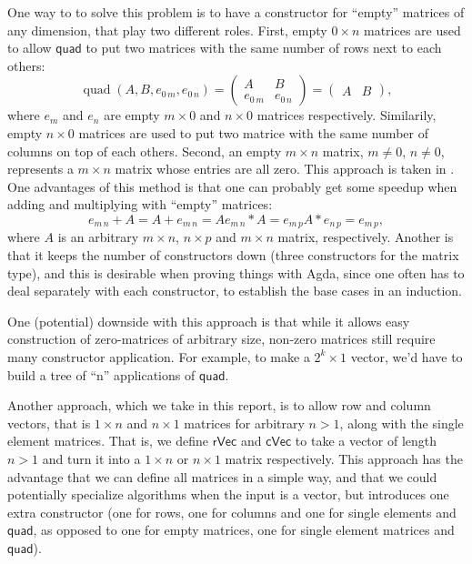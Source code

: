 \documentclass{article}
\newcommand{\Varid}[1]{\mathit{#1}}
\renewcommand\Varid[1]{\mathord{\textsf{#1}}}
\begin{document}
One way to to solve this problem is to have a constructor for ``empty'' matrices of any dimension, that play two different roles. First, empty $0 \times n$ matrices are used to allow \ensuremath{\Varid{quad}} to put two matrices with the same number of rows next to each others:
\begin{equation}
\operatorname{quad}(A, B, e_{0\,m}, e_{0\,n}) =
\begin{pmatrix}
  A & B \\
  e_{0\,m} & e_{0\,n}
\end{pmatrix} = 
\begin{pmatrix}
  A & B
\end{pmatrix},
\end{equation}
where $e_m$ and $e_n$ are empty $m \times 0$ and $n\times 0$ matrices respectively. Similarily, empty $n \times 0$ matrices are used to put two matrice with the same number of columns on top of each others. Second, an empty $m \times n$ matrix, $m \ne 0$, $n \ne 0$, represents a $m \times n$ matrix whose entries are all zero. This approach is taken in \cite{JP-PP}. One advantages of this method is that one can probably get some speedup when adding and multiplying with ``empty'' matrices:
\begin{equation*}
  e_{m\, n} + A = A + e_{m\,n} = A
  e_{m\, n} * A = e_{m\,p}
  A * e_{n\,p}  = e_{m\,p},
\end{equation*}
where $A$ is an arbitrary $m \times n$, $n \times p$ and $m \times n$ matrix, respectively.
Another is that it keeps the number of constructors down (three constructors for the matrix type), and this is desirable when proving things with Agda, since one often has to deal separately with each constructor, to establish the base cases in an induction.

One (potential) downside with this approach is that while it allows easy construction of zero-matrices of arbitrary size, non-zero matrices still require many constructor application. For example, to make a $2^k \times 1$ vector, we'd have to build a tree of ``n''  applications of \ensuremath{\Varid{quad}}.

Another approach, which we take in this report, is to allow row and column vectors, that is $1 \times n$ and $n \times 1$ matrices for arbitrary $n > 1$, along with the single element matrices. That is, we define \ensuremath{\Varid{rVec}} and \ensuremath{\Varid{cVec}} to take a vector of length $n > 1$ and turn it into a $1 \times n$ or $n \times 1$ matrix respectively.
This approach has the advantage that we can define all matrices in a simple way, and that we could potentially specialize algorithms when the input is a vector, but introduces one extra constructor (one for rows, one for columns and one for single elements and \ensuremath{\Varid{quad}}, as opposed to one for empty matrices, one for single element matrices and \ensuremath{\Varid{quad}}).
\end{document}
